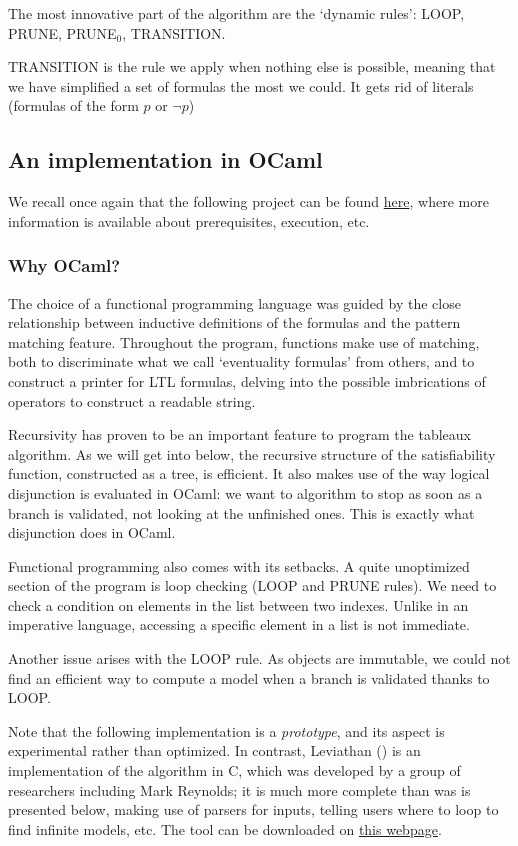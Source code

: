 \documentclass[11pt]{article}
\def\CC{{C\nolinebreak[4]\hspace{-.05em}\raisebox{.4ex}{\tiny\bf ++}}}
\theoremstyle{definition}
\begin{document}
The most innovative part of the algorithm are the `dynamic rules': LOOP, PRUNE, {PRUNE}$_0$, TRANSITION.

TRANSITION is the rule we apply when nothing else is possible, meaning that we have simplified a set of formulas the most we could. It gets 
rid of literals (formulas of the form $p$ or $\neg p$)


\subsection{An implementation in OCaml}

We recall once again that the following project can be found 
\href{https://github.com/anatcaramba/LTL-SAT-Solver-by-Reynolds-Tableaux}{here},
where more information is available about prerequisites, execution, etc.

\subsubsection*{Why OCaml?}
The choice of a functional programming language was guided by the close relationship
between inductive definitions of the formulas and the pattern matching feature.
Throughout the program, functions make use of matching, both to discriminate
what we call `eventuality formulas' from others, and to construct a printer
for LTL formulas, delving into the possible imbrications of operators to construct
a readable string.

Recursivity has proven to be an important feature to program the tableaux algorithm. 
As we will get into below, the recursive structure of the satisfiability function,
constructed as a tree, is efficient. It also makes use of the way logical disjunction
is evaluated in OCaml: we want to algorithm to stop as soon as a branch is validated,
not looking at the unfinished ones. This is exactly what disjunction does in OCaml.

Functional programming also comes with its setbacks. A quite unoptimized section of 
the program is loop checking (LOOP and PRUNE rules). We need to check a condition on 
elements in the list between two indexes. Unlike in an imperative language, accessing
a specific element in a list is not immediate. 

Another issue arises with the LOOP rule. As objects 
are immutable, we could not find an efficient way to compute a model when a branch is
validated thanks to LOOP. 

Note that the following implementation is a \emph{prototype}, and its aspect is 
experimental rather than optimized. In contrast, Leviathan (\cite{Leviathan})
is an implementation of the algorithm in \CC, which was developed by a group of researchers including Mark Reynolds;
it is much more complete than was is presented below, making use of parsers for inputs,
telling users where to loop to find infinite models, etc. The tool can be downloaded on \href{https://github.com/Corralx/leviathan}{this webpage}.
    
\end{document}
